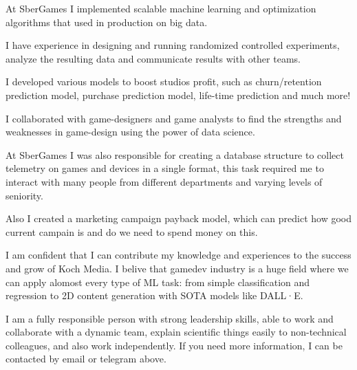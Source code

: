 \documentclass[11pt, a4paper]{awesome-cv}
\begin{document}
\begin{cvletter}
\begin{cvitems}
  \item {At SberGames I implemented scalable machine learning and optimization algorithms that used in production on big data.}
  \item {I have experience in designing and running randomized controlled experiments, analyze the resulting data and communicate results with other teams.}
  \item {I developed various models to boost studios profit, such as churn/retention prediction model, purchase prediction model, life-time prediction and much more!}
  \item {I collaborated with game-designers and game analysts to find the strengths and weaknesses in game-design using the power of data science.}
  \item {At SberGames I was also responsible for creating a database structure to collect telemetry on games and devices in a single format, this task required me to interact with many people from different departments and varying levels of seniority.}
  \item {Also I created a marketing campaign payback model, which can predict how good current campain is and do we need to spend money on this.}
  
\end{cvitems}
\bigskip


I am confident that I can contribute my knowledge and experiences to the success and grow of Koch Media. I belive that gamedev industry is a huge field where we can apply alomost every type of ML task: from simple classification and regression to 2D content generation with SOTA models like DALL·E.

I am a fully responsible person with strong leadership skills, able to work and collaborate with a dynamic team, explain scientific things easily to non-technical colleagues, and also work independently. If you need more information, I can be contacted by email or telegram above.

\end{cvletter}


\makeletterclosing
\end{document}
